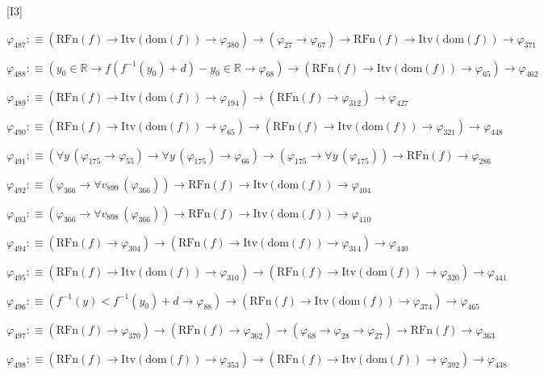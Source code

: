 \begin{fullproof}{[I3]}
\begin{abbrevlist}
\item $\varphi_{487} :\equiv (\mathrm{RFn}(f) \to \mathrm{Itv}(\mathrm{dom}(f)) \to \varphi_{380}) \to (\varphi_{27} \to \varphi_{67}) \to \mathrm{RFn}(f) \to \mathrm{Itv}(\mathrm{dom}(f)) \to \varphi_{371}$
\item $\varphi_{488} :\equiv (y_{0} \in \mathbb{R} \to f(f^{-1}(y_{0}) + d) - y_{0} \in \mathbb{R} \to \varphi_{68}) \to (\mathrm{RFn}(f) \to \mathrm{Itv}(\mathrm{dom}(f)) \to \varphi_{65}) \to \varphi_{462}$
\item $\varphi_{489} :\equiv (\mathrm{RFn}(f) \to \mathrm{Itv}(\mathrm{dom}(f)) \to \varphi_{194}) \to (\mathrm{RFn}(f) \to \varphi_{312}) \to \varphi_{427}$
\item $\varphi_{490} :\equiv (\mathrm{RFn}(f) \to \mathrm{Itv}(\mathrm{dom}(f)) \to \varphi_{65}) \to (\mathrm{RFn}(f) \to \mathrm{Itv}(\mathrm{dom}(f)) \to \varphi_{321}) \to \varphi_{448}$
\item $\varphi_{491} :\equiv (\forall y\,(\varphi_{175} \to \varphi_{55}) \to \forall y\,(\varphi_{175}) \to \varphi_{66}) \to (\varphi_{175} \to \forall y\,(\varphi_{175})) \to \mathrm{RFn}(f) \to \varphi_{286}$
\item $\varphi_{492} :\equiv (\varphi_{366} \to \forall v_{899}\,(\varphi_{366})) \to \mathrm{RFn}(f) \to \mathrm{Itv}(\mathrm{dom}(f)) \to \varphi_{404}$
\item $\varphi_{493} :\equiv (\varphi_{366} \to \forall v_{898}\,(\varphi_{366})) \to \mathrm{RFn}(f) \to \mathrm{Itv}(\mathrm{dom}(f)) \to \varphi_{410}$
\item $\varphi_{494} :\equiv (\mathrm{RFn}(f) \to \varphi_{304}) \to (\mathrm{RFn}(f) \to \mathrm{Itv}(\mathrm{dom}(f)) \to \varphi_{314}) \to \varphi_{440}$
\item $\varphi_{495} :\equiv (\mathrm{RFn}(f) \to \mathrm{Itv}(\mathrm{dom}(f)) \to \varphi_{310}) \to (\mathrm{RFn}(f) \to \mathrm{Itv}(\mathrm{dom}(f)) \to \varphi_{320}) \to \varphi_{441}$
\item $\varphi_{496} :\equiv (f^{-1}(y) < f^{-1}(y_{0}) + d \to \varphi_{88}) \to (\mathrm{RFn}(f) \to \mathrm{Itv}(\mathrm{dom}(f)) \to \varphi_{374}) \to \varphi_{465}$
\item $\varphi_{497} :\equiv (\mathrm{RFn}(f) \to \varphi_{370}) \to (\mathrm{RFn}(f) \to \varphi_{362}) \to (\varphi_{68} \to \varphi_{28} \to \varphi_{27}) \to \mathrm{RFn}(f) \to \varphi_{363}$
\item $\varphi_{498} :\equiv (\mathrm{RFn}(f) \to \mathrm{Itv}(\mathrm{dom}(f)) \to \varphi_{353}) \to (\mathrm{RFn}(f) \to \mathrm{Itv}(\mathrm{dom}(f)) \to \varphi_{392}) \to \varphi_{438}$

\end{abbrevlist}
\end{fullproof}
